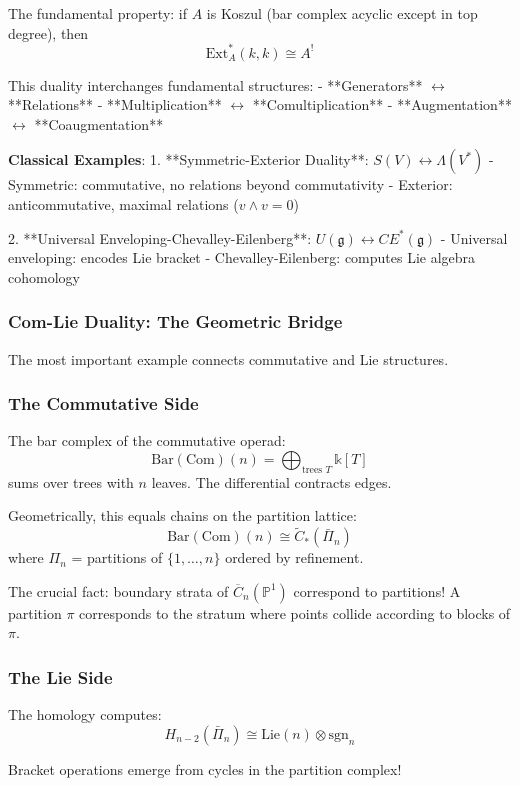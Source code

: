 The fundamental property: if $A$ is Koszul (bar complex acyclic except in top degree), then
$$\text{Ext}_A^*(k, k) \cong A^!$$

This duality interchanges fundamental structures:
- **Generators** $\leftrightarrow$ **Relations**
- **Multiplication** $\leftrightarrow$ **Comultiplication**
- **Augmentation** $\leftrightarrow$ **Coaugmentation**

\textbf{Classical Examples}:
1. **Symmetric-Exterior Duality**: $S(V) \leftrightarrow \Lambda(V^*)$
   - Symmetric: commutative, no relations beyond commutativity
   - Exterior: anticommutative, maximal relations ($v \wedge v = 0$)

2. **Universal Enveloping-Chevalley-Eilenberg**: $U(\mathfrak{g}) \leftrightarrow CE^*(\mathfrak{g})$
   - Universal enveloping: encodes Lie bracket
   - Chevalley-Eilenberg: computes Lie algebra cohomology

\subsubsection{Com-Lie Duality: The Geometric Bridge}

The most important example connects commutative and Lie structures.

\subsubsection{The Commutative Side}

The bar complex of the commutative operad:
$$\text{Bar}(\text{Com})(n) = \bigoplus_{\text{trees } T} \mathbb{k}[T]$$
sums over trees with $n$ leaves. The differential contracts edges.

Geometrically, this equals chains on the partition lattice:
$$\text{Bar}(\text{Com})(n) \cong \tilde{C}_*(\bar{\Pi}_n)$$
where $\Pi_n$ = partitions of $\{1, \ldots, n\}$ ordered by refinement.

The crucial fact: boundary strata of $\overline{C}_n(\mathbb{P}^1)$ correspond to partitions! A partition $\pi$ corresponds to the stratum where points collide according to blocks of $\pi$.

\subsubsection{The Lie Side}

The homology computes:
$$H_{n-2}(\bar{\Pi}_n) \cong \text{Lie}(n) \otimes \text{sgn}_n$$

Bracket operations emerge from cycles in the partition complex!

